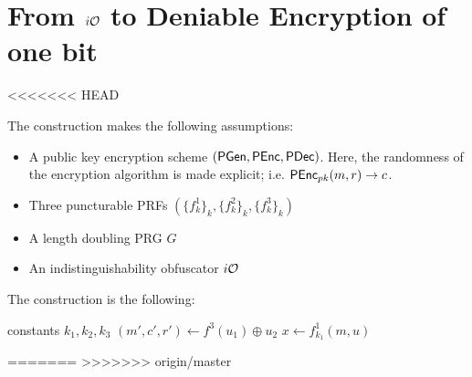 \section{From $i\mathcal{O}$ to Deniable Encryption of one bit}
<<<<<<< HEAD

The construction makes the following assumptions:
\begin{itemize}
\item A public key encryption scheme $(\mathsf{PGen},\mathsf{PEnc},\mathsf{PDec})$. Here, the randomness of the encryption algorithm is made explicit; i.e. $\mathsf{PEnc}_{pk}(m,r)\to c$.
\item Three puncturable PRFs $(\{f_k^1\}_k,\{f_k^2\}_k,\{f_k^3\}_k)$
\item A length doubling PRG $G$
\item An indistinguishability obfuscator $i\mathcal{O}$
\end{itemize}

The construction is the following:


\newcommand*\Let[2]{\State #1 $\gets$ #2}

  \begin{algorithmic}[1]
      \State constants $k_1,k_2,k_3$
      \State $(m',c',r')\gets f^3(u_1)\oplus u_2$
          \State {}
      \Else
          \State $x\gets f^1_{k_1}(m,u)$
          \State {}
      \EndIf
    \EndFunction
  \end{algorithmic}
=======
\label{sec:iO-deniable}
>>>>>>> origin/master
